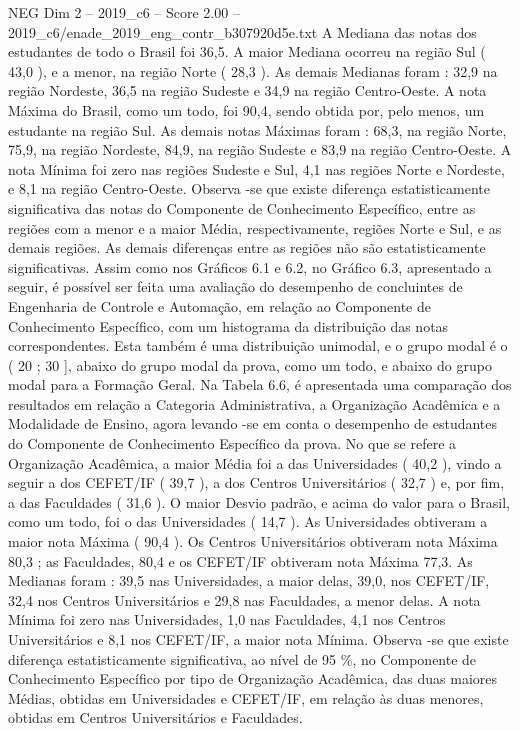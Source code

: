 \begin{textsample}{NEG Dim 2 – 2019\_c6 – Score 2.00 – 2019\_c6/enade\_2019\_eng\_contr\_b307920d5e.txt}
A Mediana das notas dos estudantes de todo o Brasil foi 36,5.
A maior Mediana ocorreu na região Sul ( 43,0 ), e a menor, na região Norte ( 28,3 ).
As demais Medianas foram : 32,9 na região Nordeste, 36,5 na região Sudeste e 34,9 na região Centro-Oeste.
A nota Máxima do Brasil, como um todo, foi 90,4, sendo obtida por, pelo menos, um estudante na região Sul.
As demais notas Máximas foram : 68,3, na região Norte, 75,9, na região Nordeste, 84,9, na região Sudeste e 83,9 na região Centro-Oeste.
A nota Mínima foi zero nas regiões Sudeste e Sul, 4,1 nas regiões Norte e Nordeste, e 8,1 na região Centro-Oeste.
Observa -se que existe diferença estatisticamente significativa das notas do Componente de Conhecimento Específico, entre as regiões com a menor e a maior Média, respectivamente, regiões Norte e Sul, e as demais regiões.
As demais diferenças entre as regiões não são estatisticamente significativas.
Assim como nos Gráficos 6.1 e 6.2, no Gráfico 6.3, apresentado a seguir, é possível ser feita uma avaliação do desempenho de concluintes de Engenharia de Controle e Automação, em relação ao Componente de Conhecimento Específico, com um histograma da distribuição das notas correspondentes.
Esta também é uma distribuição unimodal, e o grupo modal é o ( 20 ; 30 ], abaixo do grupo modal da prova, como um todo, e abaixo do grupo modal para a Formação Geral.
Na Tabela 6.6, é apresentada uma comparação dos resultados em relação a Categoria Administrativa, a Organização Acadêmica e a Modalidade de Ensino, agora levando -se em conta o desempenho de estudantes do Componente de Conhecimento Específico da prova.
No que se refere a Organização Acadêmica, a maior Média foi a das Universidades ( 40,2 ), vindo a seguir a dos CEFET/IF ( 39,7 ), a dos Centros Universitários ( 32,7 ) e, por fim, a das Faculdades ( 31,6 ).
O maior Desvio padrão, e acima do valor para o Brasil, como um todo, foi o das Universidades ( 14,7 ).
As Universidades obtiveram a maior nota Máxima ( 90,4 ).
Os Centros Universitários obtiveram nota Máxima 80,3 ; as Faculdades, 80,4 e os CEFET/IF obtiveram nota Máxima 77,3.
As Medianas foram : 39,5 nas Universidades, a maior delas, 39,0, nos CEFET/IF, 32,4 nos Centros Universitários e 29,8 nas Faculdades, a menor delas.
A nota Mínima foi zero nas Universidades, 1,0 nas Faculdades, 4,1 nos Centros Universitários e 8,1 nos CEFET/IF, a maior nota Mínima.
Observa -se que existe diferença estatisticamente significativa, ao nível de 95 \%, no Componente de Conhecimento Específico por tipo de Organização Acadêmica, das duas maiores Médias, obtidas em Universidades e CEFET/IF, em relação às duas menores, obtidas em Centros Universitários e Faculdades.

\end{textsample}
